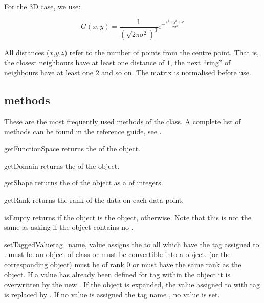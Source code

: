 \noindent For the 3D case, we use:

\[ G(x,y) = \frac{1}{(\sqrt{2\pi\sigma^2})^3} e^{-\frac{x^2+y^2+z^2}{2\sigma^2}} \]

All distances ($x$,$y$,$z$) refer to the number of points from the centre point. 
That is, the closest neighbours have at least one distance of $1$, the next
``ring'' of neighbours have at least one $2$ and so on.
The matrix is normalised before use.

\subsection{\Data methods}
These are the most frequently used methods of the \Data class.
A complete list of methods can be found in the reference guide,
see \ReferenceGuide.

\begin{methoddesc}[Data]{getFunctionSpace}{}
returns the \FunctionSpace of the object.
\end{methoddesc}

\begin{methoddesc}[Data]{getDomain}{}
returns the \Domain of the object.
\end{methoddesc}

\begin{methoddesc}[Data]{getShape}{}
returns the \Shape of the object as a  of integers.
\end{methoddesc}

\begin{methoddesc}[Data]{getRank}{}
returns the rank of the data on each data point.
\end{methoddesc}

\begin{methoddesc}[Data]{isEmpty}{}
returns \True if the \Data object is the \EmptyData object, \False otherwise.
Note that this is not the same as asking if the object contains no \DataSamplePoints.
\end{methoddesc}

\begin{methoddesc}[Data]{setTaggedValue}{tag_name, value}
assigns the  to all \DataSamplePoints which have the tag
assigned to .  must be an object of class
 or must be convertible into a  object.
 (or the corresponding  object) must be of
rank $0$ or must have the same rank as the object.
If a value has already been defined for tag  within the object
it is overwritten by the new . If the object is expanded,
the value assigned to \DataSamplePoints with tag  is replaced by
. If no value is assigned the tag name , no value is set.
\end{methoddesc}

